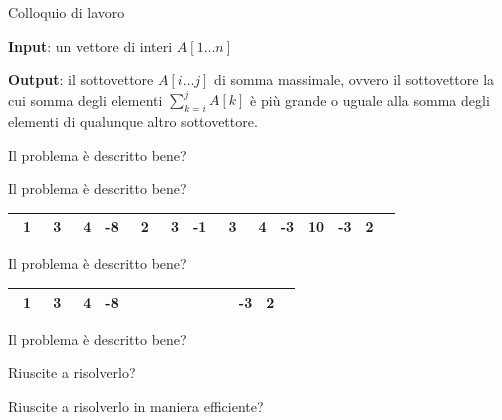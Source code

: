 \begin{frame}[fragile]{Colloquio di lavoro}
	
\vspace{-6pt}
\begin{myboxtitle}
\BI
\item \textbf{Input}: un vettore di interi $A[1 \ldots n]$
\item \textbf{Output}: il sottovettore $A[i \ldots j]$ di somma massimale,
ovvero il sottovettore la cui somma degli elementi $\sum_{k=i}^j A[k]$ è
più grande o uguale alla somma degli elementi di qualunque altro sottovettore.
\EI
\end{myboxtitle}

\begin{overprint}	
\BI
\item Il problema è descritto bene?
\EI

\BI
\item Il problema è descritto bene?
\EI

\bigskip
\begin{center}
\begingroup
\small
\begin{tabular}{|r|r|r|r|r|r|r|r|r|r|r|r|r|r|}
\hline
      ~1 & ~3 & ~4 & -8 & ~{2} & {~3} & {-1} & {~3} & {~4} & {-3} & {10} & -3 &  2 \\\hline
\end{tabular}
\endgroup
\end{center}


\BI
\item Il problema è descritto bene?
\EI

\bigskip
\begin{center}
\begingroup
\small
\begin{tabular}{|r|r|r|r|r|r|r|r|r|r|r|r|r|r|}
\hline
       ~1 & ~3 & ~4 & -8 & ~\cellcolor{red!30}{2} & \cellcolor{red!30}{~3} & \cellcolor{red!30}{-1} & \cellcolor{red!30}{~3} & \cellcolor{red!30}{~4} & \cellcolor{red!30}{-3} & \cellcolor{red!30}{10} & -3 &  2 \\\hline
\end{tabular}
\endgroup
\end{center}

\BI
\item Il problema è descritto bene?
\item Riuscite a risolverlo?
\item Riuscite a risolverlo in maniera efficiente?
\EI

\end{overprint}

\end{frame}

